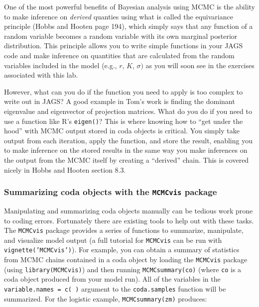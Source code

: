 \documentclass[12pt,english]{article}
\begin{document}
\begin{mdframed}[frametitle={Box 1: Using R to calculate derived quantities from MCMC objects}, backgroundcolor=black!10]
One of the most powerful benefits of Bayesian analysis using MCMC is the ability to make inference on \emph{derived} quanties using what is called the equivariance principle (Hobbs and Hooten \citeyearpar{hobbs2015bayesian} page 194), which simply says that any function of a random variable becomes a random variable with its own marginal posterior distribution. This principle allows you to write simple functions in your JAGS code and make inference on quantities that are calculated from the random variables included in the model (e.g., $r$, $K$, $\sigma)$ as you will soon see in the exercises associated with this lab. 

\noindent However, what can you do if the function you need to apply is too complex to write out in JAGS? A good example in Tom's work is finding the dominant eigenvalue and eigenvector of projection matrices. What do you do if you need to use a function like R's \texttt{eigen()}? This is where knowing how to ``get under the hood'' with MCMC output stored in coda objects is critical. You simply take output from each iteration, apply the function, and store the result, enabling you to make inference on the stored results in the same way you make inferences on the output from the MCMC itself by creating a ``derived'' chain. This is covered nicely in Hobbs and Hooten \citeyearpar{hobbs2015bayesian} section 8.3.
\end{mdframed}


\subsubsection{Summarizing coda objects with the \texttt{MCMCvis} package}

Manipulating and summarizing coda objects manually can be tedious work prone to coding errors. Fortunately there are existing tools to help out with these tasks. The \texttt{MCMCvis} package \citep{youngflesh2018} provides a series of functions to summarize, manipulate, and visualize model output (a full tutorial for \texttt{MCMCvis} can be run with \texttt{vignette('MCMCvis')}). For example, you can obtain a summary of statistics from MCMC chains contained in a coda object by loading the \texttt{MCMCvis} package (using \texttt{library(MCMCvis)}) and then running \texttt{MCMCsummary(co)} (where \texttt{co} is a coda object produced from your model run). All of the variables in the \texttt{variable.names = c( )} argument to the \texttt{coda.samples} function will be summarized. For the logistic example, \texttt{MCMCsummary(zm)} produces:
\end{document}
